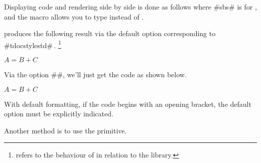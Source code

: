 \documentclass{tutodoc}
\begin{document}
\begin{tdocexa}
     Displaying code and rendering side by side is done as follows where \tdoclatexin#sbs# is for , and the macro  allows you to type  instead of .
    
\end{tdocexa}




\begin{tdocexa}[Following]
     produces the following result via the default option corresponding to \tdoclatexin#tdocstyle{std}#\,.
    \footnote{
         refers to the  behaviour of  in relation to the  library.
    }

    \begin{tdoclatex}
        $A = B + C$
    \end{tdoclatex}
\end{tdocexa}




\begin{tdocexa}
    Via the option \tdoclatexin##, we'll just get the code as shown below.

    \begin{tdoclatex}
        $A = B + C$
    \end{tdoclatex}
\end{tdocexa}




\begin{tdocwarn}
    With default formatting, if the code begins with an opening bracket, the default option must be explicitly indicated.

    \smallskip

    Another method is to use the  primitive.
\end{tdocwarn}
\end{document}
